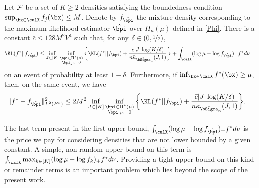 \begin{proposition}\label{prop:2}
Let $\cal F$ be a set of $K\ge 2$ densities satisfying the boundedness condition
$\sup_{\bx\in\calX} f_j(\bx)\le M$. Denote by $f_{\hat\bpi}$ the mixture density
corresponding to the maximum likelihood estimator $\hat\bpi$ over $\Pi_n(\mu)$
defined in \eqref{Phi}. There is a constant $\bar c\le 128 M^2V^4$ such that,
for any $\delta \in (0,\nicefrac12)$,
\begin{align}
 \KL(f^*|| f_{\hat\bpi}) &\leq \inf_{J\subset [K]}
    \inf_{\substack{\bpi \in \Pi^*(\mu)\\ \bpi_{J^c}=0}}\bigg\{ \KL(f^*|| f_{\bpi})
    + \frac{\bar c|J|\log(K/\delta)}{n\bar\kappa_{\hat\bSigma_n}(J,1)}\bigg\} +
    \int_{\calX}(\log\mu-\log f_{\hat\bpi})_+f^*d\nu
    \label{boundDevFive}
\end{align}
on an event of probability at least $1-\delta$. Furthermore, if $\inf_{\bx\in\calX} f^*(\bx)
\ge \mu$, then, on the same event, we have
\begin{align}
 \|f^*-f_{\hat\bpi}\|_{L^2(P^*)}^2
    &\leq 2M^2\inf_{J\subset [K]}\inf_{\substack{\bpi \in \Pi^*(\mu)\\ \bpi_{J^c}=0}}
        \bigg\{ \KL(f^*|| f_{\bpi}) + \frac{\bar c|J|\log(K/\delta)}{
        n\bar\kappa_{\hat\bSigma_n}(J,1)}\bigg\}.
    \label{boundDevSix}
\end{align}
\end{proposition}

The last term present in the first upper bound,  $\int_{\calX}(\log\mu-\log f_{\hat\bpi})_+f^*d\nu$
is the price we pay for considering densities that are not lower bounded by a given constant.
A simple, non-random upper bound on this term is $\int_{\calX}\max_{k\in [K]}(\log\mu-\log f_k)_+f^*d\nu$.
Providing a tight upper bound on this kind or remainder terms is an important problem which lies
beyond the scope of the present work.





